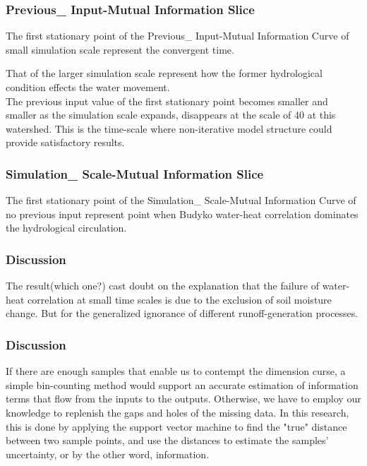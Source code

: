 \documentclass{beamer}
\begin{document}
\begin{CJK}{UTF8}{gkai}
\begin{frame}
\frametitle{Previous\_ Input-Mutual Information Slice}
The first stationary point of the Previous\_ Input-Mutual Information Curve of small simulation scale represent the convergent time. 

That of the larger simulation scale represent how the former hydrological condition effects the water movement.
\\

The previous input value of the first stationary point becomes smaller and smaller as the simulation scale expands, disappears at the scale of 40 at this watershed. This is the time-scale where non-iterative model structure could provide satisfactory results.
\end{frame}

\begin{frame}
\frametitle{Simulation\_ Scale-Mutual Information Slice}
The first stationary point of the Simulation\_ Scale-Mutual Information Curve of no previous input represent point when Budyko water-heat correlation dominates the hydrological circulation.
\end{frame}






\begin{frame}
\frametitle{Discussion}
The result(which one?) cast doubt on the explanation that the failure of water-heat correlation at small time scales is due to the exclusion of soil moisture change.
But for the generalized ignorance of different runoff-generation processes.
\end{frame}


\begin{frame}
\frametitle{Discussion}
If there are enough samples that enable us to contempt the dimension curse, a simple bin-counting method would support an accurate estimation of information terms that flow from the inputs  to the outputs. Otherwise, we have to employ our knowledge to replenish the gaps and holes of the missing data. In this research, this is done by applying the support vector machine to find the "true" distance between two sample points, and use the distances to estimate the samples' uncertainty, or by the other word, information. 
\end{frame}
 
 
\end{CJK}
\end{document}
